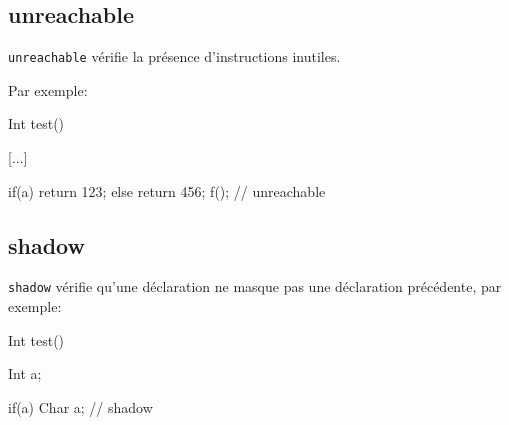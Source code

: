 \documentclass{scrartcl}
\begin{document}
  \subsection{unreachable}
    \verb"unreachable" vérifie la présence d'instructions inutiles.

    Par exemple:
    \begin{moccode}
Int test() {
    [...]

    if(a) {
        return 123;
    }
    else {
        return 456;
    }
    f(); // unreachable
}
    \end{moccode}

  \subsection{shadow}
    \verb"shadow" vérifie qu'une déclaration ne masque pas une déclaration
    précédente, par exemple:
    \begin{moccode}
Int test() {
    Int a;

    if(a) {
        Char a; // shadow
    }
}
    \end{moccode}
\end{document}
